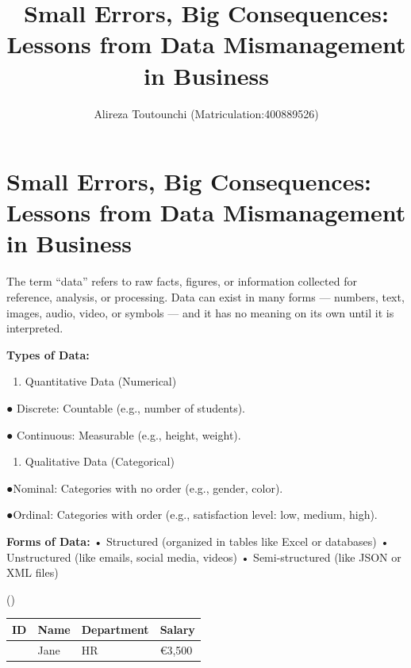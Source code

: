 \documentclass[
  man,
  floatsintext,
  longtable,
  nolmodern,
  notxfonts,
  notimes,
  colorlinks=true,linkcolor=blue,citecolor=blue,urlcolor=blue]{apa7}
\title{Small Errors, Big Consequences: Lessons from Data Mismanagement
in Business}
\author{Alireza Toutounchi (Matriculation:400889526)}
\affiliation{
{Hochschule Fresenius - University of Applied Science}}
\providecommand{\tightlist}{%
  \setlength{\itemsep}{0pt}\setlength{\parskip}{0pt}}
\begin{document}
\maketitle

\hypertarget{toc}{}
\tableofcontents
\newpage
\section[Introduction]{Small Errors, Big Consequences: Lessons from Data
Mismanagement in Business}

\setcounter{secnumdepth}{-\maxdimen} %

\setlength\LTleft{0pt}


The term ``data'' refers to raw facts, figures, or information collected
for reference, analysis, or processing. Data can exist in many forms ---
numbers, text, images, audio, video, or symbols --- and it has no
meaning on its own until it is interpreted.

\textbf{Types of Data:}

\begin{enumerate}
\def\labelenumi{\arabic{enumi}.}
\tightlist
\item
  Quantitative Data (Numerical)
\end{enumerate}

● Discrete: Countable (e.g., number of students).

● Continuous: Measurable (e.g., height, weight).

\begin{enumerate}
\def\labelenumi{\arabic{enumi}.}
\setcounter{enumi}{1}
\tightlist
\item
  Qualitative Data (Categorical)
\end{enumerate}

●Nominal: Categories with no order (e.g., gender, color).

●Ordinal: Categories with order (e.g., satisfaction level: low, medium,
high).

\textbf{Forms of Data:} • Structured (organized in tables like Excel or
databases) • Unstructured (like emails, social media, videos) •
Semi-structured (like JSON or XML files)

()

\begin{longtable}[]{@{}rlll@{}}
\toprule\noalign{}
ID & Name & Department & Salary \\
\midrule\noalign{}
\endhead
\bottomrule\noalign{}
\endlastfoot
102 & Jane & HR & €3,500 \\
\end{longtable}
\end{document}
